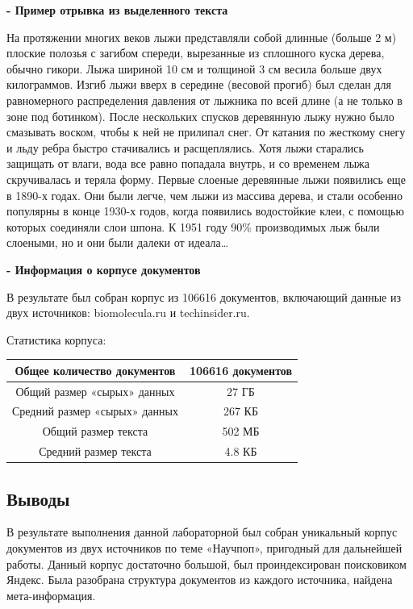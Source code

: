 \documentclass[pdf, unicode, 12pt, a4paper, oneside, fleqn]{article}
\begin{document}
\textbf{- Пример отрывка из выделенного текста}

На протяжении многих веков лыжи представляли собой длинные (больше 2 м) плоские полозья с загибом спереди, вырезанные из сплошного куска дерева, обычно гикори. Лыжа шириной 10 см и толщиной 3 см весила больше двух килограммов. Изгиб лыжи вверх в середине (весовой прогиб) был сделан для равномерного распределения давления от лыжника по всей длине (а не только в зоне под ботинком). После нескольких спусков деревянную лыжу нужно было смазывать воском, чтобы к ней не прилипал снег. От катания по жесткому снегу и льду ребра быстро стачивались и расщеплялись. Хотя лыжи старались защищать от влаги, вода все равно попадала внутрь, и со временем лыжа скручивалась и теряла форму. Первые слоеные деревянные лыжи появились еще в 1890-х годах. Они были легче, чем лыжи из массива дерева, и стали особенно популярны в конце 1930-х годов, когда появились водостойкие клеи, с помощью которых соединяли слои шпона. К 1951 году 90\% производимых лыж были слоеными, но и они были далеки от идеала…

\textbf{- Информация о корпусе документов}

В результате был собран корпус из 106616 документов, включающий данные из двух источников: biomolecula.ru и techinsider.ru.

Статистика корпуса:

\begin{center}
\begin{tabular}{ |c|c| }
\hline
 Общее количество документов & 106616 документов \\ 
 \hline
 Общий размер «сырых» данных & 27 ГБ \\
 \hline
 Средний размер «сырых» данных & 267 КБ \\
 \hline
 Общий размер текста & 502 МБ \\
 \hline
 Средний размер текста & 4.8 КБ \\
 \hline
\end{tabular}
\end{center}

\subsection*{Выводы}

В результате выполнения данной лабораторной был собран уникальный корпус документов из двух источников по теме «Научпоп», пригодный для дальнейшей работы. Данный корпус достаточно большой, был проиндексирован поисковиком Яндекс. Была разобрана структура документов из каждого источника, найдена мета-информация.
\end{document}
